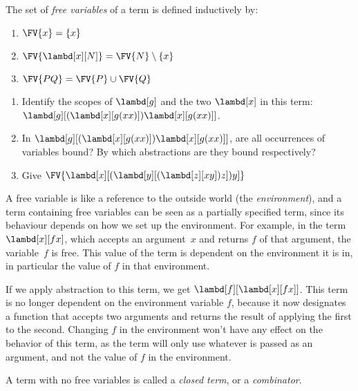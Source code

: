 \documentclass[../../../include/open-logic-section]{subfiles}
\begin{document}
\begin{defn} 
  The set of \emph{free variables} of a term is defined inductively by:
  \begin{enumerate}
    \item $\FV{x} = \{x\}$  
    \item $\FV{\lambd[x][N]} = \FV{N} \setminus \{x\}$    
    \item $\FV{PQ} = \FV{P} \cup \FV{Q}$ 
  \end{enumerate}
\end{defn}

\begin{prob}
  \begin{enumerate}
  \item Identify the scopes of $\lambd[g]$ and the two $\lambd[x]$ in
    this term: $\lambd[g][(\lambd[x][g (x x)]) \lambd[x][g (x x)]]$.
  \item In $\lambd[g][(\lambd[x][g (x x)]) \lambd[x][g (x x)]]$, are
    all occurrences of variables bound? By which abstractions are they
    bound respectively?
    \item Give $\FV{\lambd[x][(\lambd[y][(\lambd[z][x y]) z]) y]}$
  \end{enumerate}
\end{prob}

\begin{explain}
A free variable is like a reference to the outside world (the
\emph{environment}), and a term containing free variables can be seen
as a partially specified term, since its behaviour depends on how we
set up the environment. For example, in the term $\lambd[x][f x]$, which
accepts an argument~$x$ and returns $f$ of that argument, the
variable~$f$ is free. This value of the term is dependent on the
environment it is in, in particular the value of $f$ in that
environment.

If we apply abstraction to this term, we get $\lambd[f][\lambd[x][f
    x]]$. This term is no longer dependent on the environment variable
$f$, because it now designates a function that accepts two arguments
and returns the result of applying the first to the second. Changing
$f$ in the environment won't have any effect on the behavior of this
term, as the term will only use whatever is passed as an argument, and
not the value of $f$ in the environment.
\end{explain}

\begin{defn}
  A term with no free variables is called a \emph{closed term}, or a
  \emph{combinator}.
\end{defn}
\end{document}

